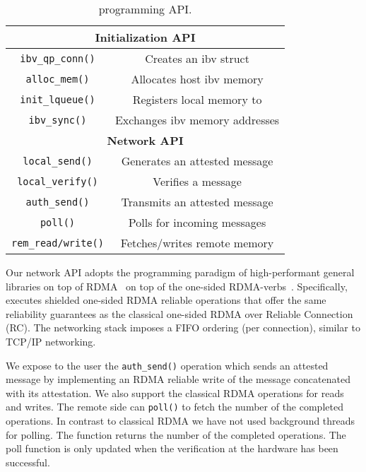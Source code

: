 \begin{table}
\begin{center}
\begin{tabular}{ |c|c| } 
 \hline
 \multicolumn{2}{|c|}{{\bf Initialization API}} \\ [0.5ex] \hline 
 {\tt ibv\_qp\_conn()} & Creates an ibv struct \\
 {\tt alloc\_mem()}    & Allocates host ibv memory \\
 {\tt init\_lqueue()}    & Registers local memory to \projecttitle{} \\
 {\tt ibv\_sync()} & Exchanges ibv memory addresses \\
 \hline
 \hline
 \multicolumn{2}{|c|}{{\bf Network API}} \\ [0.5ex] \hline 
 {\tt local\_send()}    & Generates an attested message \\
 {\tt local\_verify()}    & Verifies a message \\
 {\tt auth\_send()} &  Transmits an attested message \\
 {\tt poll()} &  Polls for incoming messages \\
 {\tt rem\_read/write()} &  Fetches/writes remote memory \\
 \hline
\end{tabular}
\end{center}
\caption{\projecttitle{} programming API.}
\label{tab:apis}
\end{table}




 Our network API adopts the programming paradigm of high-performant general libraries on top of RDMA~\cite{erpc} on top of the one-sided RDMA-verbs~\cite{rdma}. Specifically, \projecttitle{} executes shielded one-sided RDMA reliable operations that offer the same reliability guarantees as the classical one-sided RDMA over Reliable Connection (RC). The networking stack imposes a FIFO ordering (per connection), similar to TCP/IP networking.

We expose to the user the {\tt auth\_send()} operation which sends an attested message by implementing an RDMA reliable write of the message concatenated with its attestation. We also support the classical RDMA operations for reads and writes. The remote side can {\tt poll()} to fetch the number of the completed operations. In contrast to classical RDMA we have not used background threads for polling. The function returns the number of the completed operations. The poll function is only updated when the verification at the \projecttitle{} hardware has been successful. 

